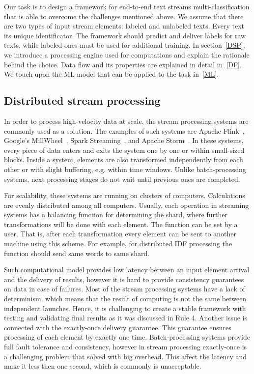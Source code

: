

Our task is to design a framework for end-to-end text streams multi-classification that is able to overcome the challenges mentioned above. We assume that there are two types of input stream elements: labeled and unlabeled texts. Every text its unique identificator. The framework should predict and deliver labels for raw texts, while labeled ones must be used for additional training. In section~\ref{DSP}, we introduce a processing engine used for computations and explain the rationale behind the choice. Data flow and its properties are explained in detail in~\ref{DF}. We touch upon the ML model that can be applied to the task in~\ref{ML}.

\subsection{Distributed stream processing\label{DSP}}

In order to process high-velocity data at scale, the stream processing systems are commonly used as a solution. The examples of such systems are Apache Flink~\cite{Carbone:2017:SMA:3137765.3137777}, Google's MillWheel~\cite{Akidau:2013:MFS:2536222.2536229}, Spark Streaming~\cite{Zaharia:2012:DSE:2342763.2342773}, and Apache Storm~\cite{apache:storm}. In these systems, every piece of data enters and exits the system one by one or within small-sized blocks. Inside a system, elements are also transformed independently from each other or with slight buffering, e.g. within time windows. Unlike batch-processing systems, next processing stages do not wait until previous ones are completed. 

For scalability, these systems are running on clusters of computers. Calculations are evenly distributed among all computers. Usually, each operation in streaming systems has a balancing function for determining the shard, where further transformations will be done with each element. The function can be set by a user. That is, after each transformation every element can be sent to another machine using this scheme. For example, for distributed IDF processing the function should send same words to same shard.

Such computational model provides low latency between an input element arrival and the delivery of results, however it is hard to provide consistency guarantees on data in case of failures. Most of the stream processing systems have a lack of determinism, which means that the result of computing is not the same between independent launches. Hence, it is challenging to create a stable framework with testing and validating final results as it was discussed in \cite{stonebraker20058} Rule 4. Another issue is connected with the exactly-once delivery guarantee. This guarantee ensures processing of each element by exactly one time. Batch-processing systems provide full fault tolerance and consistency, however in stream processing exactly-once is a challenging problem that solved with big overhead. This affect the latency and make it less then one second, which is commonly is unacceptable.

